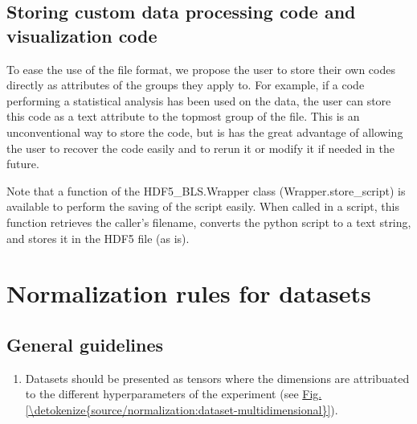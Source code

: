 \documentclass[letterpaper,10pt,english]{sphinxmanual}
\begin{document}
\subsection{Storing custom data processing code and visualization code}
\label{\detokenize{source/normalization:storing-custom-data-processing-code-and-visualization-code}}
\sphinxAtStartPar
To ease the use of the file format, we propose the user to store their own codes directly as attributes of the groups they apply to. For example, if a code performing a statistical analysis has been used on the data, the user can store this code as a text attribute to the topmost group of the file. This is an unconventional way to store the code, but is has the great advantage of allowing the user to recover the code easily and to re\sphinxhyphen{}run it or modify it if needed in the future.

\sphinxAtStartPar
Note that a function of the HDF5\_BLS.Wrapper class (Wrapper.store\_script) is available to perform the saving of the script easily. When called in a script, this function retrieves the caller’s filename, converts the python script to a text string, and stores it in the HDF5 file (as is).


\section{Normalization rules for datasets}
\label{\detokenize{source/normalization:normalization-rules-for-datasets}}

\subsection{General guidelines}
\label{\detokenize{source/normalization:general-guidelines}}\begin{enumerate}
%
\item {} 
\sphinxAtStartPar
Datasets should be presented as tensors where the dimensions are attribuated to the different hyperparameters of the experiment (see \hyperref[\detokenize{source/normalization:dataset-multidimensional}]{Fig.\@ \ref{\detokenize{source/normalization:dataset-multidimensional}}}).

\end{enumerate}
\end{document}
